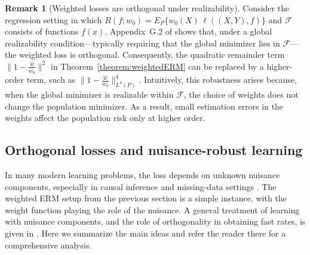 \documentclass[11pt]{article}
\theoremstyle{plain}
\theoremstyle{definition} %
\newtheorem{remark}{Remark}
\begin{document}
\begin{remark}[Weighted losses are orthogonal under realizability]
Consider the regression setting in which $R(f;w_0)=E_P\{w_0(X)\,\ell((X,Y),f)\}$ and $\mathcal{F}$ consists of functions $f(x)$. Appendix~G.2 of \cite{foster2023orthogonal} shows that, under a global realizability condition—typically requiring that the global minimizer lies in $\mathcal{F}$—the weighted loss is orthogonal. Consequently, the quadratic remainder term $\bigl\|1 - \tfrac{\hat w}{w_0}\bigr\|^2$ in Theorem~\ref{theorem:weightedERM} can be replaced by a higher-order term, such as $\bigl\|1 - \tfrac{\hat w}{w_0}\bigr\|_{L^4(P)}^4$. Intuitively, this robustness arises because, when the global minimizer is realizable within $\mathcal{F}$, the choice of weights does not change the population minimizer. As a result, small estimation errors in the weights affect the population risk only at higher order.
\end{remark}

\subsection{Orthogonal losses and nuisance-robust learning}

 
In many modern learning problems, the loss depends on unknown nuisance components,
especially in causal inference and missing-data settings
\citep{rubin2006doubly, van2003unified, Tlearner, nie2021quasi, kennedy2023towards, foster2023orthogonal, van2023causal, yang2023forster, van2024combining}.
The weighted ERM setup from the previous section is a simple instance, with the
weight function playing the role of the nuisance. A general treatment of
learning with nuisance components, and the role of orthogonality in obtaining
fast rates, is given in \citet{foster2023orthogonal}. Here we summarize the main
ideas and refer the reader there for a comprehensive analysis.
\end{document}
